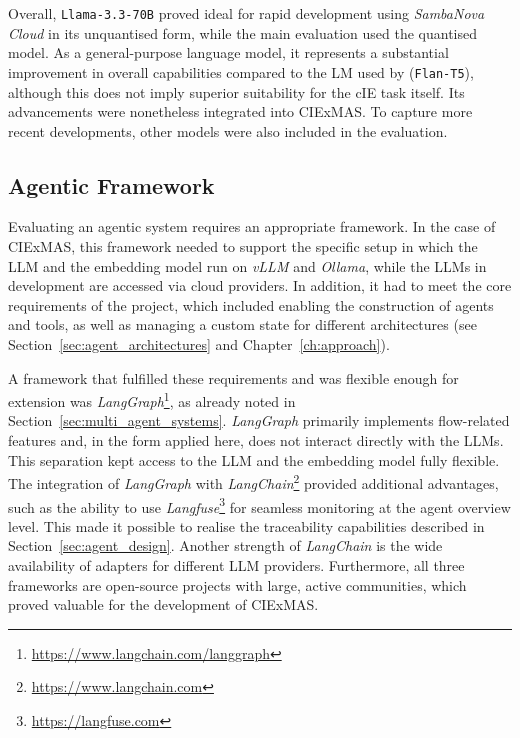 \documentclass[a4paper,oneside,bibliography=totoc]{scrbook}
\begin{document}
Overall, \texttt{Llama-3.3-70B} proved ideal for rapid development using \textit{SambaNova Cloud} in its unquantised form, while the main evaluation used the quantised model. As a general-purpose language model, it represents a substantial improvement in overall capabilities compared to the \ac{LM} used by \citet{Josifoski2023} (\texttt{Flan-T5}), although this does not imply superior suitability for the \ac{cIE} task itself. Its advancements were nonetheless integrated into CIExMAS. To capture more recent developments, other models were also included in the evaluation.

\subsection{Agentic Framework}
\label{subsec:agentic_framework}

Evaluating an agentic system requires an appropriate framework. In the case of CIExMAS, this framework needed to support the specific setup in which the \ac{LLM} and the embedding model run on \textit{vLLM} and \textit{Ollama}, while the \acp{LLM} in development are accessed via cloud providers. In addition, it had to meet the core requirements of the project, which included enabling the construction of agents and tools, as well as managing a custom state for different architectures (see Section~\ref{sec:agent_architectures} and Chapter~\ref{ch:approach}).

A framework that fulfilled these requirements and was flexible enough for extension was \textit{LangGraph}\footnote{\url{https://www.langchain.com/langgraph}}, as already noted in Section~\ref{sec:multi_agent_systems}. \textit{LangGraph} primarily implements flow-related features and, in the form applied here, does not interact directly with the \acp{LLM}. This separation kept access to the \ac{LLM} and the embedding model fully flexible. The integration of \textit{LangGraph} with \textit{LangChain}\footnote{\url{https://www.langchain.com}} provided additional advantages, such as the ability to use \textit{Langfuse}\footnote{\url{https://langfuse.com}} for seamless monitoring at the agent overview level. This made it possible to realise the traceability capabilities described in Section~\ref{sec:agent_design}. Another strength of \textit{LangChain} is the wide availability of adapters for different \ac{LLM} providers. Furthermore, all three frameworks are open-source projects with large, active communities, which proved valuable for the development of CIExMAS.
\end{document}

